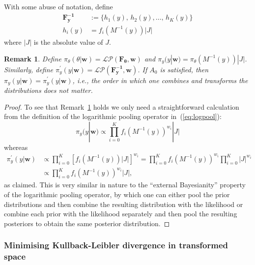 \documentclass[11pt]{article}
\newtheorem{rmk}{Remark}[]
\begin{document}
With some abuse of notation, define
  \begin{align}
  \label{eq:transfF}
  \mathbf{F^{-1}_y} &:= \{h_1(y), \, h_2(y), \ldots, \, h_K(y) \} \\
  h_i(y) & = f_i(M^{-1}(y))|J|\nonumber
  \end{align}
where $|J|$ is the absolute value of $J$.
\begin{rmk}
\label{rmk:invariance}
Define $\pi_{\theta}(\theta | \mathbf{w}) =  \mathcal{LP}(\mathbf{F_\theta}, \mathbf{w})$ and $\pi_{y}(y |\mathbf{w}) = \pi_{\theta}(M^{-1}(y))|J|$.
Similarly, define $\pi^{\prime}_{y}(y|\mathbf{w}) = \mathcal{LP}(\mathbf{F^{-1}_y}, \mathbf{w})$.
If $A_0$ is satisfied, then $\pi_{y}(y |\mathbf{w}) = \pi^{\prime}_{y}(y|\mathbf{w})$, i.e., the order in which one combines and transforms the distributions does not matter.
\end{rmk}
\begin{proof}
To see that Remark~\ref{rmk:invariance} holds we only need a straightforward calculation from the definition of the logarithmic pooling operator in~(\ref{eq:logpool}):
\[\pi_{y}(y |\mathbf{w}) \propto \prod_{i=0}^K f_i(M^{-1}(y))^{w_i}|J| \]
whereas
\begin{align*}
 \pi^{\prime}_{y}(y|\mathbf{w}) &\propto  \prod_{i=0}^K \left[ f_i(M^{-1}(y))|J| \right] ^{w_i} = \prod_{i=0}^K f_i(M^{-1}(y))^{w_i} \prod_{i=0}^K|J|^{w_i}\\
 &\propto  \prod_{i=0}^K f_i(M^{-1}(y))^{w_i}|J|, %
\end{align*}
as claimed.
This is very similar in nature to the ``external Bayesianity'' property of the logarithmic pooling operator, by which one can either pool the prior distributions and then combine the resulting distribution with the likelihood or combine each prior with the likelihood separately and then pool the resulting posteriors to obtain the same posterior distribution.
\end{proof}

\subsubsection{Minimising Kullback-Leibler divergence in transformed space}
\end{document}
